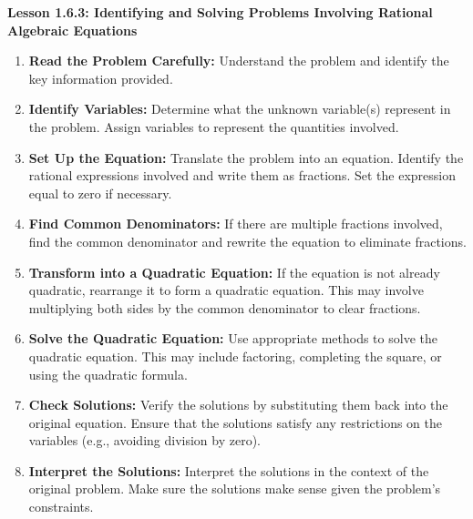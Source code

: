 \begin{center}
\textbf{Lesson 1.6.3: Identifying and Solving Problems Involving Rational Algebraic Equations}
\end{center}

\vspace*{1ex}

\begin{enumerate}[label = \color{blue}\arabic*. ]
\item \textbf{Read the Problem Carefully:} Understand the problem and identify the key information provided.
\item \textbf{Identify Variables:} Determine what the unknown variable(s) represent in the problem. Assign variables to represent the quantities involved.
\item \textbf{Set Up the Equation:} Translate the problem into an equation. Identify the rational expressions involved and write them as fractions. Set the expression equal to zero if necessary.
\item \textbf{Find Common Denominators:} If there are multiple fractions involved, find the common denominator and rewrite the equation to eliminate fractions.
\item \textbf{Transform into a Quadratic Equation:} If the equation is not already quadratic, rearrange it to form a quadratic equation. This may involve multiplying both sides by the common denominator to clear fractions.
\item \textbf{Solve the Quadratic Equation:} Use appropriate methods to solve the quadratic equation. This may include factoring, completing the square, or using the quadratic formula.
\item \textbf{Check Solutions:} Verify the solutions by substituting them back into the original equation. Ensure that the solutions satisfy any restrictions on the variables (e.g., avoiding division by zero).
\item \textbf{Interpret the Solutions:} Interpret the solutions in the context of the original problem. Make sure the solutions make sense given the problem's constraints.
\end{enumerate}



